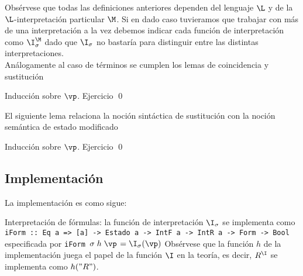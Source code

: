 \documentclass[11pt,letterpaper]{article}
\begin{document}
Obsérvese que todas las definiciones anteriores dependen del lenguaje $\L$ y
de la $\L$-interpretación particular $\M$. Si en dado caso tuvieramos que
trabajar con más de una interpretación a la vez debemos indicar cada función
de interpretación como $\I_\sigma^\M$ dado que $\I_\sigma$ no bastaría para
distinguir entre las distintas interpretaciones.\\



Análogamente al caso de términos se cumplen los lemas de coincidencia y
sustitución

\proof
Inducción sobre $\vp$. Ejercicio
\qed



El siguiente lema relaciona la noción sintáctica de
sustitución con la noción semántica de estado modificado


\proof
Inducción sobre $\vp$. Ejercicio
\qed

\espc



\subsection{Implementación}

La implementación es como sigue:

\bi

\item Interpretación de fórmulas: la función de interpretación $\I_\sigma$ se implementa como
\bc
{\tt iForm :: Eq a => [a] -> Estado a -> IntF a -> IntR a -> Form -> Bool}
\ec
especificada por
\bc
{\tt iForm $\sigma\;h\;\vp$} $= \I_\sigma(\vp)$
\ec
Obsérvese que la función $h$ de la implementación juega el papel de la función $\I$ en la teoría, es decir, $R^\I$ se implementa como $h("R")$.
\ei
\end{document}
